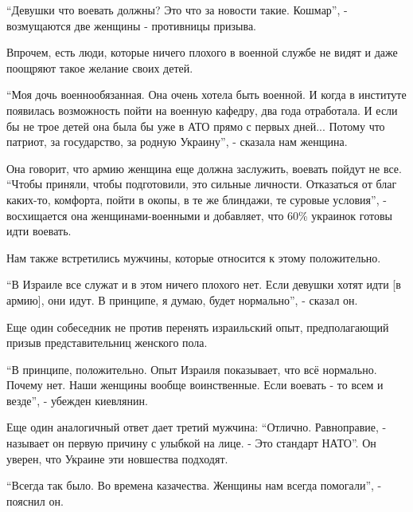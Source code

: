 \begin{multicols}{2}

\enquote{Девушки что воевать должны? Это что за новости такие. Кошмар}, - возмущаются
две женщины - противницы призыва.


Впрочем, есть люди, которые ничего плохого в военной службе не видят и даже
поощряют такое желание своих детей.

\enquote{Моя дочь военнообязанная. Она очень хотела быть военной. И когда в институте
появилась возможность пойти на военную кафедру, два года отработала. И если бы
не трое детей она была бы уже в АТО прямо с первых дней... Потому что патриот,
за государство, за родную Украину}, - сказала нам женщина. 

Она говорит, что армию женщина еще должна заслужить, воевать пойдут не все.
\enquote{Чтобы приняли, чтобы подготовили, это сильные личности. Отказаться от благ
каких-то, комфорта, пойти в окопы, в те же блиндажи, те суровые условия}, -
восхищается она женщинами-военными и добавляет, что 60\% украинок готовы идти
воевать.


Нам также встретились мужчины, которые относится к этому положительно. 

\enquote{В Израиле все служат и в этом ничего плохого нет. Если девушки хотят идти [в
армию], они идут. В принципе, я думаю, будет нормально}, - сказал он.


Еще один собеседник не против перенять израильский опыт, предполагающий призыв
представительниц женского пола. 

\enquote{В принципе, положительно. Опыт Израиля показывает, что всё нормально. Почему
нет. Наши женщины вообще воинственные. Если воевать - то всем и везде}, -
убежден киевлянин.


Еще один аналогичный ответ дает третий мужчина: \enquote{Отлично. Равноправие, -
называет он первую причину с улыбкой на лице. - Это стандарт НАТО}. Он уверен,
что Украине эти новшества подходят.

\enquote{Всегда так было. Во времена казачества. Женщины нам всегда помогали}, -
пояснил он.



\end{multicols}
